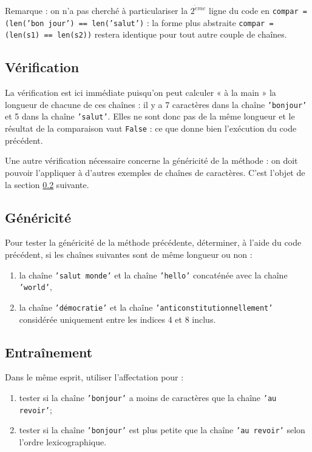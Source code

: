 Remarque : on n'a pas cherché à 
particulariser la $2^{\grave eme}$ ligne du code en \texttt{compar = (len('bon jour') == len('salut')} :
la forme plus abstraite \texttt{compar = (len(s1) == len(s2))} restera identique pour 
tout autre couple de chaînes. 

\subsection{Vérification}\label{affectation:textes:verification}
La vérification est ici immédiate puisqu'on peut calculer « à la main »
la longueur de chacune de ces chaînes : il y a 7 caractères dans la chaîne \texttt{'bonjour'}
et 5 dans la chaîne \texttt{'salut'}. Elles ne sont donc pas de la même longueur et le résultat
de la comparaison vaut \texttt{False} : ce que donne bien l'exécution du code précédent.

Une autre vérification nécessaire concerne la généricité de la méthode : 
on doit pouvoir l'appliquer à d'autres exemples de chaînes de caractères.
C'est l'objet de la section \ref{affectation:textes:genericite} suivante.

\subsection{Généricité}\label{affectation:textes:genericite}
Pour tester la généricité de la méthode précédente, déterminer, à l'aide du code \python{} précédent, 
si les chaînes suivantes sont de même longueur ou non :
\begin{enumerate}
\item la chaîne \texttt{'salut monde'} et la chaîne \texttt{'hello'} concaténée 
	avec la chaîne \texttt{'world'},
\item la chaîne \texttt{'démocratie'} et la chaîne \texttt{'anticonstitutionnellement'} considérée uniquement 
	entre les indices 4 et 8 inclus.
\end{enumerate}

\subsection{Entraînement}\label{affectation:textes:entrainement}
Dans le même esprit, utiliser l'affectation pour :
\begin{enumerate}
\item tester si la chaîne \texttt{'bonjour'} a moins de caractères que la chaîne \texttt{'au revoir'};
\item tester si la chaîne \texttt{'bonjour'} est plus petite que la chaîne \texttt{'au revoir'} 
	selon l'ordre lexicographique.
\end{enumerate}

